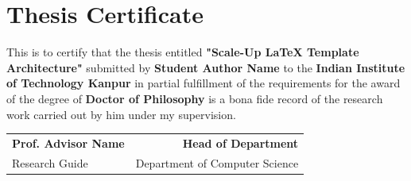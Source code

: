 \chapter*{Thesis Certificate}
This is to certify that the thesis entitled \textbf{"Scale-Up LaTeX Template Architecture"} submitted by \textbf{Student Author Name} to the \textbf{Indian Institute of Technology Kanpur} in partial fulfillment of the requirements for the award of the degree of \textbf{Doctor of Philosophy} is a bona fide record of the research work carried out by him under my supervision.

\vspace{2cm}
\noindent
\begin{tabular*}{\textwidth}{@{\extracolsep{\fill}}lr}
    \textbf{Prof. Advisor Name} & \textbf{Head of Department} \\
    Research Guide & Department of Computer Science
\end{tabular*}
